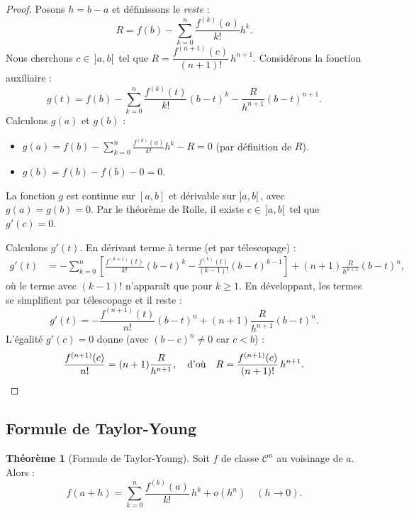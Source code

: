 \documentclass[12pt,a4paper,openany]{book}
\theoremstyle{definition}
\newtheorem{theoreme}{Théorème}[chapter]
\begin{document}
\begin{proof}
Posons $h = b - a$ et définissons le \emph{reste} :
\[
  R = f(b) - \sum_{k=0}^{n} \frac{f^{(k)}(a)}{k!} h^k.
\]
Nous cherchons $c \in \,]a, b[\,$ tel que $R = \dfrac{f^{(n+1)}(c)}{(n+1)!}\,h^{n+1}$. Considérons la fonction auxiliaire :
\[
  g(t) = f(b) - \sum_{k=0}^{n} \frac{f^{(k)}(t)}{k!}(b - t)^k - \frac{R}{h^{n+1}}(b-t)^{n+1}.
\]
Calculons $g(a)$ et $g(b)$ :
\begin{itemize}
  \item $g(a) = f(b) - \displaystyle\sum_{k=0}^{n} \frac{f^{(k)}(a)}{k!}h^k - R = 0$ (par définition de $R$).
  \item $g(b) = f(b) - f(b) - 0 = 0$.
\end{itemize}
La fonction $g$ est continue sur $[a, b]$ et dérivable sur $]a, b[\,$, avec $g(a) = g(b) = 0$. Par le théorème de Rolle, il existe $c \in \,]a, b[\,$ tel que $g'(c) = 0$.

Calculons $g'(t)$. En dérivant terme à terme (et par télescopage) :
\begin{align*}
  g'(t) &= -\sum_{k=0}^{n}\left[\frac{f^{(k+1)}(t)}{k!}(b-t)^k - \frac{f^{(k)}(t)}{(k-1)!}(b-t)^{k-1}\right] + (n+1)\frac{R}{h^{n+1}}(b-t)^n,
\end{align*}
où le terme avec $(k-1)!$ n'apparaît que pour $k \geqslant 1$. En développant, les termes se simplifient par télescopage et il reste :
\[
  g'(t) = -\frac{f^{(n+1)}(t)}{n!}(b-t)^n + (n+1)\frac{R}{h^{n+1}}(b-t)^n.
\]
L'égalité $g'(c) = 0$ donne (avec $(b-c)^n \neq 0$ car $c < b$) :
\[
  \frac{f^{(n+1)}(c)}{n!} = (n+1)\frac{R}{h^{n+1}},
  \quad\text{d'où}\quad
  R = \frac{f^{(n+1)}(c)}{(n+1)!}\,h^{n+1}. \qedhere
\]
\end{proof}

\subsection{Formule de Taylor-Young}

\begin{theoreme}[Formule de Taylor-Young]\label{thm:taylor-young}
Soit $f$ de classe $\mathcal{C}^n$ au voisinage de $a$. Alors :
\[
  f(a + h) = \sum_{k=0}^{n} \frac{f^{(k)}(a)}{k!}\,h^k + o(h^n) \quad (h \to 0).
\]
\end{theoreme}
\end{document}
